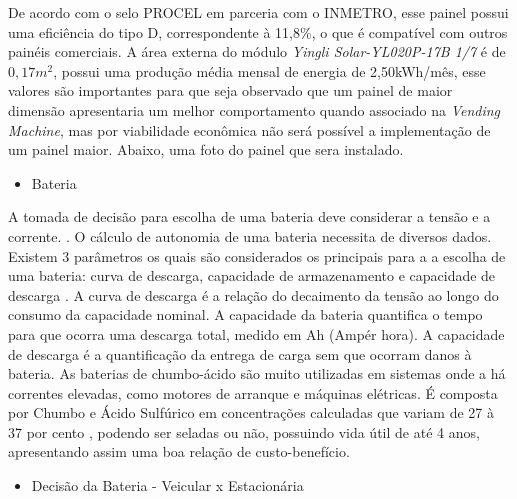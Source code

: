         	De acordo com o selo PROCEL em parceria com o INMETRO, esse painel possui uma eficiência do tipo D, correspondente à 11,8\%, o que é compatível com outros painéis comerciais. 
            A área externa do módulo \textit{Yingli Solar-YL020P-17B 1/7} é de $0,17m^{2}$, possui uma produção média mensal de energia de 2,50kWh/mês, esse valores são importantes para que seja observado que um painel de maior dimensão apresentaria um melhor comportamento quando associado na \textit{Vending Machine}, mas por viabilidade econômica não será possível a implementação de um painel maior.
            Abaixo, uma foto do painel que sera instalado.
            
  
\begin{itemize}
\item Bateria
\end{itemize}
	  
      A tomada de decisão para escolha de uma bateria deve considerar a tensão e a corrente.  \cite{de2011}. O cálculo de autonomia de uma bateria necessita de diversos dados. Existem 3 parâmetros os quais são considerados os principais para a a escolha de uma bateria: curva de descarga, capacidade de armazenamento e capacidade de descarga \cite{meggiolaro2006tutorial}. A curva de descarga é a relação do decaimento da tensão ao longo do consumo da capacidade nominal. A capacidade da bateria quantifica o tempo para que ocorra uma descarga total, medido em Ah (Ampér hora). A capacidade de descarga é a quantificação da entrega de carga sem que ocorram danos à bateria.
      As baterias de chumbo-ácido são muito utilizadas em sistemas onde a há correntes  elevadas, como motores de arranque e máquinas elétricas. É composta por Chumbo e Ácido Sulfúrico em concentrações calculadas que variam de 27 à 37 por cento \cite{de2005estudo}, podendo ser seladas ou não, possuindo vida útil de até 4 anos, apresentando assim uma boa relação de custo-benefício.

\begin{itemize}
\item Decisão da Bateria - Veicular x Estacionária
\end{itemize}


